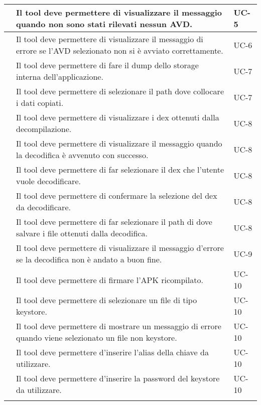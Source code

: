 \begin{center}
\begin{longtable}{ | c| C{7cm} |C{3cm} |}
         &Il tool deve permettere di visualizzare il messaggio quando non sono stati rilevati nessun AVD. & UC-5 \\\hline
         &Il tool deve permettere di visualizzare il messaggio di errore se l'AVD selezionato non si è avviato correttamente.& UC-6 \\\hline
         &Il tool deve permettere di fare il dump dello storage interna dell'applicazione.& UC-7 \\\hline
         & Il tool deve permettere di selezionare il path dove collocare i dati copiati.& UC-7\\\hline
        \setcounter{subCount}{0}

         &Il tool deve permettere di visualizzare i dex ottenuti dalla decompilazione.& UC-8\\\hline
         & Il tool deve permettere di visualizzare il messaggio quando la decodifica è avvenuto con successo.& UC-8\\\hline
         & Il tool deve permettere di far selezionare il dex che l'utente vuole decodificare.& UC-8\\\hline
         & Il tool deve permettere di confermare la selezione del dex da decodificare.& UC-8\\\hline
         & Il tool deve permettere di far selezionare il path di dove salvare i file ottenuti dalla decodifica.& UC-8\\\hline
        \setcounter{subCount}{0}

         &Il tool deve permettere di visualizzare il messaggio d'errore se la decodifica non è andato a buon fine.& UC-9 \\\hline

        & Il tool deve permettere di firmare l'APK ricompilato.& UC-10 \\\hline
         & Il tool deve permettere di selezionare un file di tipo keystore.&UC-10\\\hline
        & Il tool deve permettere di mostrare un messaggio di errore quando viene selezionato un file non keystore.& UC-10 \\\hline
         & Il tool deve permettere d'inserire l'alias della chiave da utilizzare.& UC-10\\\hline
         & Il tool deve permettere d'inserire la password del keystore da utilizzare.& UC-10 \\\hline
        \setcounter{subCount}{0}


\end{longtable}
\end{center}
